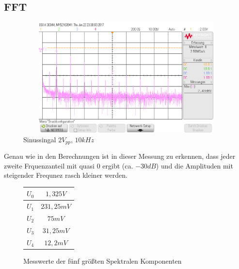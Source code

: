 \subsection{FFT}
\begin{figure}[H]
 \begin{center}
  \includegraphics[height=6cm,width=12cm]{OsziBilder/bsp4_sin_fft_10Vpp_dB.png}
 \end{center}
 \caption{Sinussingal $2V_{pp}$, $10kHz$}\label{bsp4_fft}
\end{figure}
\noindent
Genau wie in den Berechnungen ist in dieser Messung zu erkennen, dass jeder zweite Frquenzanteil mit quasi 0 ergibt (ca. $-30dB$) und die Amplituden mit steigender Frequnez rasch kleiner werden.

\begin{figure}[H]
  \begin{center}
    \begin{tabular}{|c|c|} \hline
    $U_0$ & $1,325V$ \\ \hline
    $U_1$ & $231,25mV$ \\ \hline
    $U_2$ & $75mV$ \\ \hline
    $U_3$ & $31,25mV$ \\ \hline
    $U_4$ & $12,2mV$ \\ \hline
    \end{tabular}
  \end{center}
  \caption{Messwerte der f\"unf gr\"o\ss{}ten Spektralen Komponenten}
\end{figure}
\noindent
